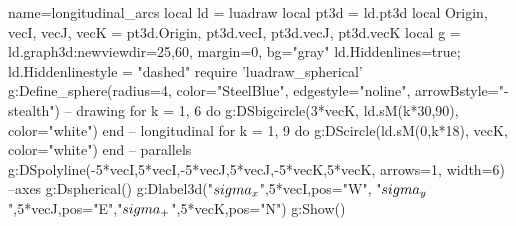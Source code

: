 \documentclass[border=5pt]{standalone}%
\begin{document}
\begin{luadraw}{name=longitudinal_arcs}
local ld = luadraw
local pt3d = ld.pt3d
local Origin, vecI, vecJ, vecK = pt3d.Origin, pt3d.vecI, pt3d.vecJ, pt3d.vecK
local g = ld.graph3d:new{viewdir={25,60}, margin=0, bg="gray"}
ld.Hiddenlines=true; ld.Hiddenlinestyle = "dashed"
require 'luadraw_spherical'
g:Define_sphere({radius=4, color="SteelBlue", edgestyle="noline", arrowBstyle="-stealth"})
-- drawing
for k = 1, 6 do g:DSbigcircle({3*vecK, ld.sM(k*30,90)}, {color="white"}) end -- longitudinal
for k = 1, 9 do g:DScircle({ld.sM(0,k*18), vecK}, {color="white"}) end -- parallels
g:DSpolyline({{-5*vecI,5*vecI},{-5*vecJ,5*vecJ},{-5*vecK,5*vecK}}, {arrows=1, width=6}) --axes
g:Dspherical()
g:Dlabel3d("$\\sigma_x$",5*vecI,{pos="W"}, "$\\sigma_y$",5*vecJ,{pos="E"},"$\\sigma_+$",5*vecK,{pos="N"})
g:Show()
\end{luadraw}
\end{document}

